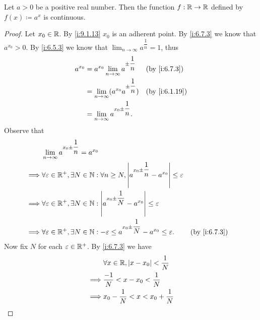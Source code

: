 \begin{prop}\label{i:9.4.10}
  Let \(a > 0\) be a positive real number.
  Then the function \(f : \mathbb{R} \to \mathbb{R}\) defined by \(f(x) \coloneqq a^x\) is continuous.
\end{prop}

\begin{proof}
  Let \(x_0 \in \mathbb{R}\).
  By \cref{i:9.1.13} \(x_0\) is an adherent point.
  By \cref{i:6.7.3} we know that \(a^{x_0} > 0\).
  By \cref{i:6.5.3} we know that \(\lim_{n \to \infty} a^{\dfrac{1}{n}} = 1\), thus
  \begin{align*}
    a^{x_0} & = a^{x_0} \lim_{n \to \infty} a^{\pm \dfrac{1}{n}}   &  & \by{i:6.7.3}  \\
            & = \lim_{n \to \infty} (a^{x_0} a^{\pm \dfrac{1}{n}}) &  & \by{i:6.1.19} \\
            & = \lim_{n \to \infty} a^{x_0 \pm \dfrac{1}{n}}.
  \end{align*}
  Observe that
  \begin{align*}
             & \lim_{n \to \infty} a^{x_0 \pm \dfrac{1}{n}} = a^{x_0}                                                                                         \\
    \implies & \forall \varepsilon \in \R^+, \exists N \in \N : \forall n \geq N, \abs{a^{x_0 \pm \dfrac{1}{n}} - a^{x_0}} \leq \varepsilon                   \\
    \implies & \forall \varepsilon \in \R^+, \exists N \in \N : \abs{a^{x_0 \pm \dfrac{1}{N}} - a^{x_0}} \leq \varepsilon                                     \\
    \implies & \forall \varepsilon \in \R^+, \exists N \in \N : -\varepsilon \leq a^{x_0 \pm \dfrac{1}{N}} - a^{x_0} \leq \varepsilon.      &  & \by{i:6.7.3}
  \end{align*}
  Now fix \(N\) for each \(\varepsilon \in \mathbb{R}^+\).
  By \cref{i:6.7.3} we have
  \begin{align*}
             & \forall x \in \R, \abs{x - x_0} < \dfrac{1}{N}                                                                                                             \\
    \implies & \dfrac{-1}{N} < x - x_0 < \dfrac{1}{N}                                                                                                                     \\
    \implies & x_0 - \dfrac{1}{N} < x < x_0 + \dfrac{1}{N}                                                                                                                \\

\end{align*}
\end{proof}
